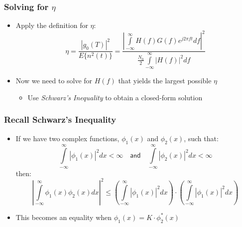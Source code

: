 \documentclass[10pt]{beamer}
\begin{document}
\frame
{
  \frametitle{Solving for $\eta$}

  \begin{itemize}
    \item Apply the definition for $\eta$:
    \begin{equation}
        \eta=\frac{|g_0(T)|^2}{E\{n^2(t)\}}=\frac{\left|\int\limits_{-\infty}^{\infty}H(f)G(f)e^{j2\pi{f}{t}}df\right|^2}{\frac{N_0}{2}\int\limits_{-\infty}^{\infty}|H(f)|^2df}
    \end{equation}
    \item Now we need to solve for $H(f)$ that yields the largest possible $\eta$
    \begin{itemize}
        \item Use {\it Schwarz's Inequality} to obtain a closed-form solution
    \end{itemize}
  \end{itemize}

}

\frame
{
  \frametitle{Recall Schwarz's Inequality}

  \begin{itemize}
    \item If we have two complex functions, $\phi_1(x)$ and $\phi_2(x)$, such that:
    \begin{equation}
        \int\limits_{-\infty}^{\infty}|\phi_1(x)|^2dx<\infty\quad\mathsf{and}\quad\int\limits_{-\infty}^{\infty}|\phi_2(x)|^2dx<\infty\nonumber
    \end{equation}
    then:
    \begin{equation}
        \left|\int\limits_{-\infty}^{\infty}\phi_1(x)\phi_2(x)dx\right|^2\le\left(\int\limits_{-\infty}^{\infty}|\phi_1(x)|^2dx\right)\cdot\left(\int\limits_{-\infty}^{\infty}|\phi_1(x)|^2dx\right)\nonumber
    \end{equation}
    \item This becomes an equality when $\phi_1(x)=K\cdot\phi_2^{\ast}(x)$
  \end{itemize}

}
\end{document}
